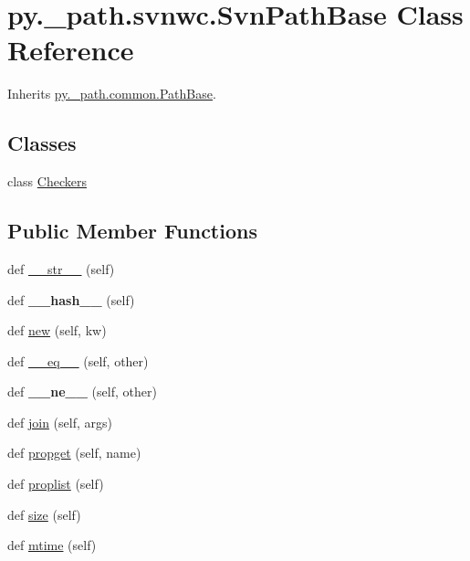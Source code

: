 \hypertarget{classpy_1_1__path_1_1svnwc_1_1_svn_path_base}{}\section{py.\+\_\+path.\+svnwc.\+Svn\+Path\+Base Class Reference}
\label{classpy_1_1__path_1_1svnwc_1_1_svn_path_base}


Inherits \hyperlink{classpy_1_1__path_1_1common_1_1_path_base}{py.\+\_\+path.\+common.\+Path\+Base}.

\subsection*{Classes}
\begin{DoxyCompactItemize}
\item 
class \hyperlink{classpy_1_1__path_1_1svnwc_1_1_svn_path_base_1_1_checkers}{Checkers}
\end{DoxyCompactItemize}
\subsection*{Public Member Functions}
\begin{DoxyCompactItemize}
\item 
def \hyperlink{classpy_1_1__path_1_1svnwc_1_1_svn_path_base_a0f7dcb869c2ffcfb3ff3a0c46138d0e8}{\+\_\+\+\_\+str\+\_\+\+\_\+} (self)
\item 
\mbox{\label{classpy_1_1__path_1_1svnwc_1_1_svn_path_base_ab184903409dcef08a62d6112464e4e7e}} 
def {\bfseries \+\_\+\+\_\+hash\+\_\+\+\_\+} (self)
\item 
def \hyperlink{classpy_1_1__path_1_1svnwc_1_1_svn_path_base_a36e702f1bce4b04bbab99b50218659ae}{new} (self, kw)
\item 
def \hyperlink{classpy_1_1__path_1_1svnwc_1_1_svn_path_base_a63a5f60052e2e371106b15315df9c5ea}{\+\_\+\+\_\+eq\+\_\+\+\_\+} (self, other)
\item 
\mbox{\label{classpy_1_1__path_1_1svnwc_1_1_svn_path_base_a0f1d5ca4d32b579652f76e259f8a4aa7}} 
def {\bfseries \+\_\+\+\_\+ne\+\_\+\+\_\+} (self, other)
\item 
def \hyperlink{classpy_1_1__path_1_1svnwc_1_1_svn_path_base_a9b5a335ea1286ea33f8cf6cb2ea470bb}{join} (self, args)
\item 
def \hyperlink{classpy_1_1__path_1_1svnwc_1_1_svn_path_base_aefde7672dedfe51ae1a46ab75c995bba}{propget} (self, name)
\item 
def \hyperlink{classpy_1_1__path_1_1svnwc_1_1_svn_path_base_a7f955b675b63298b8e6c3018fcc4055a}{proplist} (self)
\item 
def \hyperlink{classpy_1_1__path_1_1svnwc_1_1_svn_path_base_ae3f13d3f270d7283cf56916b2ccd1872}{size} (self)
\item 
def \hyperlink{classpy_1_1__path_1_1svnwc_1_1_svn_path_base_af5ba59e674df682188839251ca35d9c4}{mtime} (self)
\end{DoxyCompactItemize}
